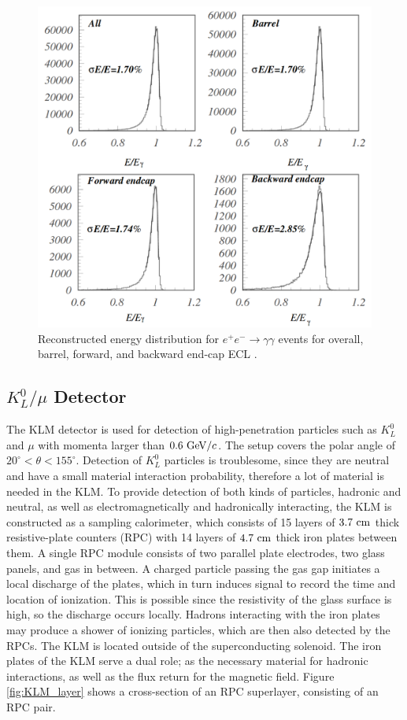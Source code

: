 \begin{figure}[H]
	\centering
	\captionsetup{width=0.8\linewidth}
	\includegraphics[width=0.8\linewidth]{fig/setup/ECL_resolution}
	\caption{Reconstructed energy distribution for $e^+e^- \to \gamma\gamma$ events for overall, barrel, forward, and backward end-cap ECL \cite{ABASHIAN2002117}.}
	\label{fig:ECL_resolution}
\end{figure}

\subsection{\texorpdfstring{$K_L^0/\mu$}{KL0/µ} Detector}
The KLM detector is used for detection of high-penetration particles such as $K_L^0$ and $\mu$ with momenta larger than $0.6\mathrm{~GeV}/c$. The setup covers the polar angle of $20^\circ < \theta < 155^\circ$. Detection of $K_L^0$ particles is troublesome, since they are neutral and have a small material interaction probability, therefore a lot of material is needed in the KLM. To provide detection of both kinds of particles, hadronic and neutral, as well as electromagnetically and hadronically interacting, the KLM is constructed as a sampling calorimeter, which consists of 15 layers of $3.7\mathrm{~cm}$ thick resistive-plate counters (RPC) with 14 layers of $4.7\mathrm{~cm}$ thick iron plates between them. A single RPC module consists of two parallel plate electrodes, two glass panels, and gas in between. A charged particle passing the gas gap initiates a local discharge of the plates, which in turn induces signal to record the time and location of ionization. This is possible since the resistivity of the glass surface is high, so the discharge occurs locally. Hadrons interacting with the iron plates may produce a shower of ionizing particles, which are then also detected by the RPCs. The KLM is located outside of the superconducting solenoid. The iron plates of the KLM serve a dual role; as the necessary material for hadronic interactions, as well as the flux return for the magnetic field. Figure \ref{fig:KLM_layer} shows a cross-section of an RPC superlayer, consisting of an RPC pair.

